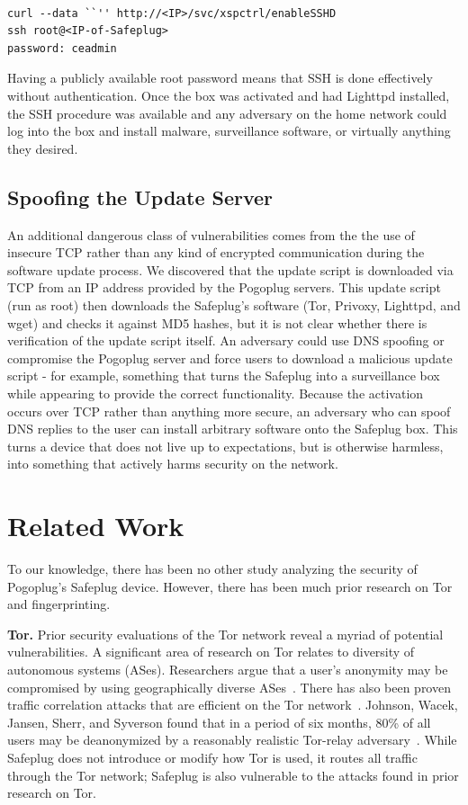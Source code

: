 \documentclass[letterpaper,twocolumn,10pt]{article}
\begin{document}
{\tt \small
\begin{verbatim}
curl --data ``'' http://<IP>/svc/xspctrl/enableSSHD
ssh root@<IP-of-Safeplug>
password: ceadmin
\end{verbatim}
}

Having a publicly available root password means that SSH is done effectively without authentication.  Once the box was activated and had Lighttpd installed, the SSH procedure was available and any adversary on the home network could log into the box and install malware, surveillance software, or virtually anything they desired.

\subsection{Spoofing the Update Server}
\label{dnsspoof}
An additional dangerous class of vulnerabilities comes from the the use of insecure TCP rather than any kind of encrypted communication during the software update process.  We discovered that the update script is downloaded via TCP from an IP address provided by the Pogoplug servers.  This update script (run as root) then downloads the Safeplug's software (Tor, Privoxy, Lighttpd, and wget) and checks it against MD5 hashes, but it is not clear whether there is verification of the update script itself.  An adversary could use DNS spoofing or compromise the Pogoplug server and force users to download a malicious update script - for example, something that turns the Safeplug into a surveillance box while appearing to provide the correct functionality.  Because the activation occurs over TCP rather than anything more secure, an adversary who can spoof DNS replies to the user can install arbitrary software onto the Safeplug box.  This turns a device that does not live up to expectations, but is otherwise harmless, into something that actively harms security on the network.

\section{Related Work}
To our knowledge, there has been no other study analyzing the security of Pogoplug's Safeplug device.  However, there has been much prior research on Tor and fingerprinting.

{\bf Tor.} Prior security evaluations of the Tor network reveal a myriad of potential vulnerabilities.  A significant area of research on Tor relates to diversity of autonomous systems (ASes).  Researchers argue that a user's anonymity may be compromised by using geographically diverse ASes~\cite{feamster, murdoch2}.  There has also been proven traffic correlation attacks that are efficient on the Tor network~\cite{murdoch, overlier}.  Johnson, Wacek, Jansen, Sherr, and Syverson found that in a period of six months, 80\% of all users may be deanonymized by a reasonably realistic Tor-relay adversary~\cite{tor2}.  While Safeplug does not introduce or modify how Tor is used, it routes all traffic through the Tor network; Safeplug is also vulnerable to the attacks found in prior research on Tor.  
\end{document}
